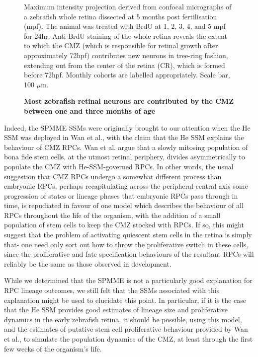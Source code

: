 \documentclass[10pt,letterpaper]{article}
\begin{document}
\begin{figure}[!h]
\caption{{\bf Most zebrafish retinal neurons are contributed by the CMZ between one and three months of age}}
Maximum intensity projection derived from confocal micrographs of a zebrafish whole retina dissected at 5 months post fertilisation (mpf). The animal was treated with BrdU at 1, 2, 3, 4, and 5 mpf for 24hr. Anti-BrdU staining of the whole retina reveals the extent to which the CMZ (which is responsible for retinal growth after approximately 72hpf) contributes new neurons in tree-ring fashion, extending out from the center of the retina (CR), which is formed before 72hpf. Monthly cohorts are labelled appropriately. Scale bar, 100 $\mu$m.
\label{RingFig}
\end{figure}

Indeed, the SPMME SSMs were originally brought to our attention when the He SSM was deployed in Wan et al.\cite{Wan2016}, with the claim that the He SSM explains the behaviour of CMZ RPCs. Wan et al. argue that a slowly mitosing population of bona fide stem cells, at the utmost retinal periphery, divides asymmetrically to populate the CMZ with He-SSM-governed RPCs. In other words, the usual suggestion that CMZ RPCs undergo a somewhat different process than embryonic RPCs, perhaps recapitulating across the peripheral-central axis some progression of states or lineage phases that embryonic RPCs pass through in time\cite{Harris1998}, is repudiated in favour of one model which describes the behaviour of all RPCs throughout the life of the organism, with the addition of a small population of stem cells to keep the CMZ stocked with RPCs. If so, this might suggest that the problem of activating quiescent stem cells in the retina is simply that- one need only sort out how to throw the proliferative switch in these cells, since the proliferative and fate specification behaviours of the resultant RPCs will reliably be the same as those observed in development.

While we determined that the SPMME is not a particularly good explanation for RPC lineage outcomes, we still felt that the SSMs associated with this explanation might be used to elucidate this point. In particular, if it is the case that the He SSM provides good estimates of lineage size and proliferative dynamics in the early zebrafish retina, it should be possible, using this model, and the estimates of putative stem cell proliferative behaviour provided by Wan et al., to simulate the population dynamics of the CMZ, at least through the first few weeks of the organism's life.
\end{document}
